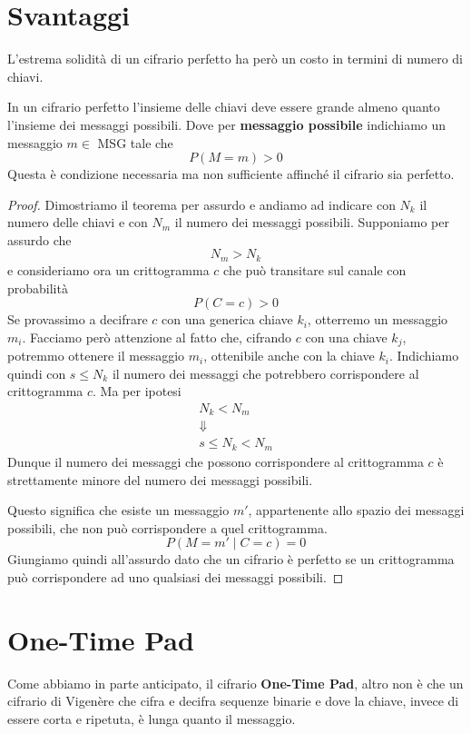 \section{Svantaggi}\label{svantaggi_perfetti}
L'estrema solidit\`a di un cifrario perfetto ha per\`o un costo in termini di numero di chiavi.

\begin{theorem}[Shannon]
	In un cifrario perfetto l'insieme delle chiavi deve essere grande almeno quanto l'insieme dei messaggi possibili.
	Dove per \textbf{messaggio possibile} indichiamo un messaggio $m \in$ MSG tale che
	\[ P(M = m) > 0 \]
	Questa \`e condizione necessaria ma non sufficiente affinch\'e il cifrario sia perfetto.
	\begin{proof}
		Dimostriamo il teorema per assurdo e andiamo ad indicare con $N_k$ il numero delle chiavi e con $N_m$ il numero
		dei messaggi possibili. Supponiamo per assurdo che
		\[ N_m > N_k \]
		e consideriamo ora un crittogramma $c$ che pu\`o transitare sul canale con probabilit\`a
		\[ P(C = c) > 0 \]
		Se provassimo a decifrare $c$ con una generica chiave $k_i$, otterremo un messaggio $m_i$. Facciamo per\`o
		attenzione al fatto che, cifrando $c$ con una chiave $k_j$, potremmo ottenere il messaggio $m_i$, ottenibile
		anche con la chiave $k_i$. Indichiamo quindi con $s \leq N_k$ il numero dei messaggi che potrebbero corrispondere
		al crittogramma $c$. Ma per ipotesi
		\begin{gather*}
			N_k < N_m \\
			\Downarrow \\
			s \leq N_k < N_m
		\end{gather*}
		Dunque il numero dei messaggi che possono corrispondere al crittogramma $c$ \`e strettamente minore	del numero
		dei messaggi possibili.

		Questo significa che esiste un messaggio $m'$, appartenente allo spazio dei messaggi possibili, che non pu\`o
		corrispondere a quel crittogramma.
		\[ P(M = m' \mid C = c) = 0 \]
		Giungiamo quindi all'assurdo dato che un cifrario \`e perfetto se un crittogramma pu\`o corrispondere ad uno
		qualsiasi dei messaggi possibili.
	\end{proof}
\end{theorem}

\section{One-Time Pad}\label{one_time_pad}
Come abbiamo in parte anticipato, il cifrario \textbf{One-Time Pad}, altro non \`e che un cifrario di Vigen\`ere che
cifra e decifra sequenze binarie e dove la chiave, invece di essere corta e ripetuta, \`e lunga quanto il messaggio.

